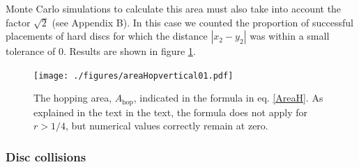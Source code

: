 \documentclass[superscriptaddress,pre,reprint,showpacs,twocolumn]{revtex4-1}
\begin{document}
Monte Carlo simulations to calculate this area must also
take into account the factor $\sqrt{2}$ (see Appendix B).
In this case we counted the proportion of successful placements of hard discs 
for which the distance 
$|x_2 - y_2|$ was within a small tolerance of $0$. 
Results are shown in figure \ref{AreaHopp01}.


\begin{figure}[h]
\centering
\texttt{[image: ./figures/areaHopvertical01.pdf]}
\caption{The hopping area, $A_\text{hop}$, 
  indicated in the formula in eq. \ref{AreaH}. As explained in the text
in the text, the formula does not apply for $r>1/4$, but numerical values correctly
remain at zero.}
\label{AreaHopp01}
\end{figure}


\subsubsection{Disc collisions}
\end{document}
